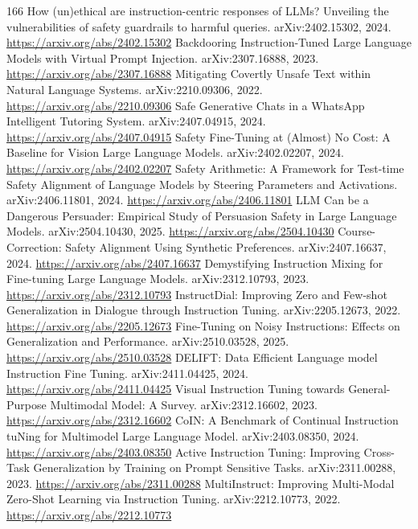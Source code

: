 \documentclass[11pt]{article}
\begin{document}
\begin{thebibliography}{166}
 How (un)ethical are instruction-centric responses of LLMs? Unveiling the vulnerabilities of safety guardrails to harmful queries. arXiv:2402.15302, 2024. \url{https://arxiv.org/abs/2402.15302}
 Backdooring Instruction-Tuned Large Language Models with Virtual Prompt Injection. arXiv:2307.16888, 2023. \url{https://arxiv.org/abs/2307.16888}
 Mitigating Covertly Unsafe Text within Natural Language Systems. arXiv:2210.09306, 2022. \url{https://arxiv.org/abs/2210.09306}
 Safe Generative Chats in a WhatsApp Intelligent Tutoring System. arXiv:2407.04915, 2024. \url{https://arxiv.org/abs/2407.04915}
 Safety Fine-Tuning at (Almost) No Cost: A Baseline for Vision Large Language Models. arXiv:2402.02207, 2024. \url{https://arxiv.org/abs/2402.02207}
 Safety Arithmetic: A Framework for Test-time Safety Alignment of Language Models by Steering Parameters and Activations. arXiv:2406.11801, 2024. \url{https://arxiv.org/abs/2406.11801}
 LLM Can be a Dangerous Persuader: Empirical Study of Persuasion Safety in Large Language Models. arXiv:2504.10430, 2025. \url{https://arxiv.org/abs/2504.10430}
 Course-Correction: Safety Alignment Using Synthetic Preferences. arXiv:2407.16637, 2024. \url{https://arxiv.org/abs/2407.16637}
 Demystifying Instruction Mixing for Fine-tuning Large Language Models. arXiv:2312.10793, 2023. \url{https://arxiv.org/abs/2312.10793}
 InstructDial: Improving Zero and Few-shot Generalization in Dialogue through Instruction Tuning. arXiv:2205.12673, 2022. \url{https://arxiv.org/abs/2205.12673}
 Fine-Tuning on Noisy Instructions: Effects on Generalization and Performance. arXiv:2510.03528, 2025. \url{https://arxiv.org/abs/2510.03528}
 DELIFT: Data Efficient Language model Instruction Fine Tuning. arXiv:2411.04425, 2024. \url{https://arxiv.org/abs/2411.04425}
 Visual Instruction Tuning towards General-Purpose Multimodal Model: A Survey. arXiv:2312.16602, 2023. \url{https://arxiv.org/abs/2312.16602}
 CoIN: A Benchmark of Continual Instruction tuNing for Multimodel Large Language Model. arXiv:2403.08350, 2024. \url{https://arxiv.org/abs/2403.08350}
 Active Instruction Tuning: Improving Cross-Task Generalization by Training on Prompt Sensitive Tasks. arXiv:2311.00288, 2023. \url{https://arxiv.org/abs/2311.00288}
 MultiInstruct: Improving Multi-Modal Zero-Shot Learning via Instruction Tuning. arXiv:2212.10773, 2022. \url{https://arxiv.org/abs/2212.10773}

\end{thebibliography}
\end{document}
